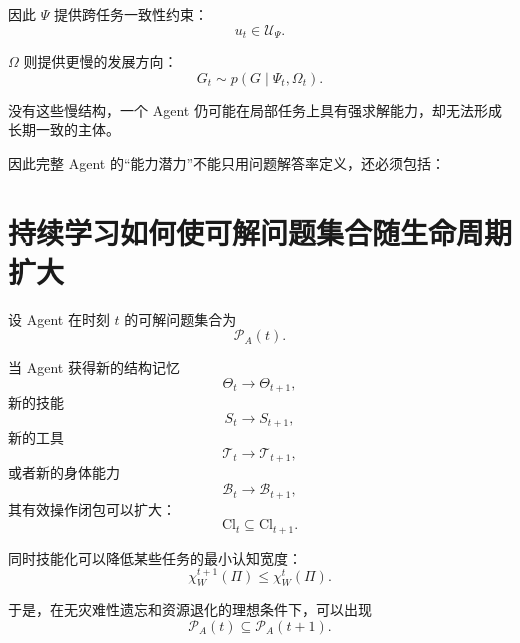 因此 $\Psi$ 提供跨任务一致性约束：
\begin{equation}
u_t
\in
\mathcal U_{\Psi}.
\end{equation}

$\Omega$ 则提供更慢的发展方向：
\begin{equation}
G_t
\sim
p(
G\mid
\Psi_t,\Omega_t
).
\end{equation}

没有这些慢结构，一个 Agent 仍可能在局部任务上具有强求解能力，却无法形成长期一致的主体。

因此完整 Agent 的“能力潜力”不能只用问题解答率定义，还必须包括：

\begin{statementbox}
\centering
{}
\end{statementbox}

\section{持续学习如何使可解问题集合随生命周期扩大}

设 Agent 在时刻 $t$ 的可解问题集合为
\begin{equation}
\mathscr P_A(t).
\end{equation}

当 Agent 获得新的结构记忆
\begin{equation}
\Theta_t\rightarrow\Theta_{t+1},
\end{equation}
新的技能
\begin{equation}
S_t\rightarrow S_{t+1},
\end{equation}
新的工具
\begin{equation}
\mathcal T_t\rightarrow\mathcal T_{t+1},
\end{equation}
或者新的身体能力
\begin{equation}
\mathcal B_t\rightarrow\mathcal B_{t+1},
\end{equation}
其有效操作闭包可以扩大：
\begin{equation}
\mathrm{Cl}_{t}
\subseteq
\mathrm{Cl}_{t+1}.
\end{equation}

同时技能化可以降低某些任务的最小认知宽度：
\begin{equation}
\chi_W^{t+1}(\Pi)
\leq
\chi_W^t(\Pi).
\end{equation}

于是，在无灾难性遗忘和资源退化的理想条件下，可以出现
\begin{equation}
\boxed{
\mathscr P_A(t)
\subseteq
\mathscr P_A(t+1).
}
\end{equation}

